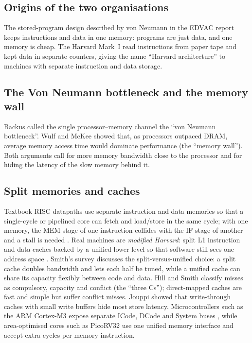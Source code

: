 \documentclass[conference]{IEEEtran}
\begin{document}
\subsection{Origins of the two organisations}
The stored-program design described by von Neumann in the EDVAC report
\cite{vonneumann1945} keeps instructions and data in one memory: programs are
just data, and one memory is cheap. The Harvard Mark~I \cite{aiken1946} read
instructions from paper tape and kept data in separate counters, giving the
name ``Harvard architecture'' to machines with separate instruction and data
storage.

\subsection{The Von Neumann bottleneck and the memory wall}
Backus \cite{backus1978} called the single processor--memory channel the
``von Neumann bottleneck''. Wulf and McKee \cite{wulf1995} showed that, as
processors outpaced DRAM, average memory access time would dominate
performance (the ``memory wall''). Both arguments call for more memory
bandwidth close to the processor and for hiding the latency of the slow
memory behind it.

\subsection{Split memories and caches}
Textbook RISC datapaths \cite{patterson2020,harris2021} use separate
instruction and data memories so that a single-cycle or pipelined core can
fetch and load/store in the same cycle; with one memory, the MEM stage of one
instruction collides with the IF stage of another and a stall is needed
\cite{hennessy2017}. Real machines are \emph{modified Harvard}: split L1
instruction and data caches backed by a unified lower level so that software
still sees one address space \cite{smith1982,hennessy2017}. Smith's survey
\cite{smith1982} discusses the split-versus-unified choice: a split cache
doubles bandwidth and lets each half be tuned, while a unified cache can share
its capacity flexibly between code and data. Hill and Smith
\cite{hill1989} classify misses as compulsory, capacity and conflict (the
``three Cs''); direct-mapped caches are fast and simple but suffer conflict
misses. Jouppi \cite{jouppi1993} showed that write-through caches with small
write buffers hide most store latency. Microcontrollers such as the ARM
Cortex-M3 expose separate ICode, DCode and System buses \cite{arm_m3}, while
area-optimised cores such as PicoRV32 \cite{picorv32} use one unified memory
interface and accept extra cycles per memory instruction.
\end{document}
